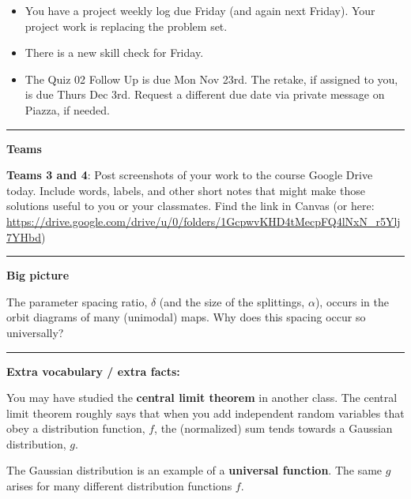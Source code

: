 \documentclass[12pt,letterpaper,noanswers]{exam}
\begin{document}
 \pdfpageheight 11in 
  \pdfpagewidth 8.5in

\noindent 




\begin{itemize}
\itemsep0em
\item You have a project weekly log due Friday (and again next Friday).  Your project work is replacing the problem set.
\item There is a new skill check for Friday.
\item The Quiz 02 Follow Up is due Mon Nov 23rd.  The retake, if assigned to you, is due Thurs Dec 3rd.  Request a different due date via private message on Piazza, if needed.
\end{itemize}

\hrule
\vspace{0.2cm}



\noindent\textbf{Teams}



\noindent \textbf{Teams 3 and 4}: Post screenshots of your work to the course Google Drive today.  Include words, labels, and other short notes that might make those solutions useful to you or your classmates.  Find the link in Canvas (or here: \url{https://drive.google.com/drive/u/0/folders/1GcpwvKHD4tMecpFQ4lNxN_r5Ylj7YHbd})


\vspace{0.2cm}

\hrule
\vspace{0.2cm}


\noindent\textbf{Big picture}

The parameter spacing ratio, $\delta$ (and the size of the splittings, $\alpha$), occurs in the orbit diagrams of many (unimodal) maps.  Why does this spacing occur so universally?  

\vspace{0.2cm}
\hrule
\vspace{0.2cm}

\noindent \textbf{Extra vocabulary / extra facts:}
\begin{tcolorbox}
You may have studied the \textbf{central limit theorem} in another class.  The central limit theorem roughly says that when you add independent random variables that obey a distribution function, $f$, the (normalized) sum tends towards a Gaussian distribution, $g$.

The Gaussian distribution is an example of a \textbf{universal function}.  The same $g$ arises for many different distribution functions $f$. 
\end{tcolorbox}
\end{document}
